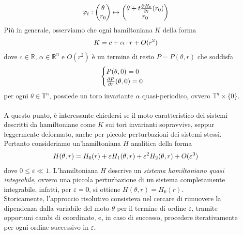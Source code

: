 \documentclass[twoside, 11pt]{amsbook}
\newcommand{\0}{{(0)}}
\newcommand{\3}{{(3)}}
\theoremstyle{colonplain}
\theoremstyle{colondefinition}
\theoremstyle{colonremark}
\numberwithin{equation}{chapter}
\begin{document}
\begin{align}
    \varphi_t : \begin{pmatrix}
        \theta \\
        r_0
    \end{pmatrix} \mapsto \begin{pmatrix}
        \theta + t\frac{\partial H_0}{\partial r}(r_0) \\
        r_0
    \end{pmatrix} \notag
\end{align}
Più in generale, osserviamo che ogni hamiltoniana $K$ della forma
\begin{align}
    K = c + \alpha \cdot r + O(r^2) \notag
\end{align}
dove $c \in \mathbb{R}$, $\alpha \in \mathbb{R}^n$ e $O(r^2)$ è un termine di resto $P = P(\theta, r)$ che soddisfa
\begin{align}
    \begin{cases}
        P(\theta, 0) = 0 \\
        \frac{\partial P}{\partial r}(\theta, 0) = 0
    \end{cases} \notag
\end{align}
per ogni $\theta \in \mathbb{T}^n$, possiede un toro invariante $\alpha$ quasi-periodico, ovvero $\mathbb{T}^n \times \{0\}$. \\ \\
A questo punto, è interessante chiedersi se il moto caratteristico dei sistemi descritti da hamiltoniane come $K$ sui tori invarianti sopravvive, seppur leggermente deformato, anche per piccole perturbazioni dei sistemi stessi. \\
Pertanto consideriamo un'hamiltoniana $H$ analitica della forma
\begin{align}
    H(\theta, r) = H_0(r) + \varepsilon H_1(\theta, r) + \varepsilon^2H_2(\theta, r) + O(\varepsilon^3) \notag 
\end{align}
dove $0 \leq \varepsilon \ll 1$. L'hamiltoniana $H$ descrive un \textit{sistema hamiltoniano quasi integrabile}, ovvero una piccola perturbazione di un sistema completamente integrabile, infatti, per $\varepsilon = 0$, si ottiene $H(\theta, r) = H_0(r)$. \\
Storicamente, l'approccio risolutivo consisteva nel cercare di rimuovere la dipendenza dalla variabile del moto $\theta$ per il termine di ordine $\varepsilon$, tramite opportuni cambi di coordinate, e, in caso di successo, procedere iterativamente per ogni ordine successivo in $\varepsilon$. \\
\end{document}
